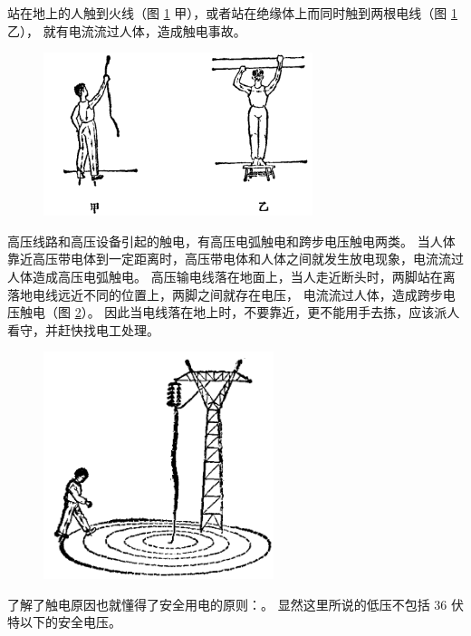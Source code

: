 站在地上的人触到火线（图 \ref{fig:11-9} 甲），或者站在绝缘体上而同时触到两根电线（图 \ref{fig:11-9} 乙），
就有电流流过人体，造成触电事故。

\begin{figure}[htbp]
    \centering
    \includegraphics[width=0.7\textwidth]{../pic/czwl2-ch11-9}
    \caption{}\label{fig:11-9}
\end{figure}

高压线路和高压设备引起的触电，有高压电弧触电和跨步电压触电两类。
当人体靠近高压带电体到一定距离时，高压带电体和人体之间就发生放电现象，电流流过人体造成高压电弧触电。
高压输电线落在地面上，当人走近断头时，两脚站在离落地电线远近不同的位置上，两脚之间就存在电压，
电流流过人体，造成跨步电压触电（图 \ref{fig:11-10}）。
因此当电线落在地上时，不要靠近，更不能用手去拣，应该派人看守，并赶快找电工处理。

\begin{figure}[htbp]
    \centering
    \includegraphics[width=0.6\textwidth]{../pic/czwl2-ch11-10}
    \caption{}\label{fig:11-10}
\end{figure}

了解了触电原因也就懂得了安全用电的原则：。
显然这里所说的低压不包括 36 伏特以下的安全电压。

